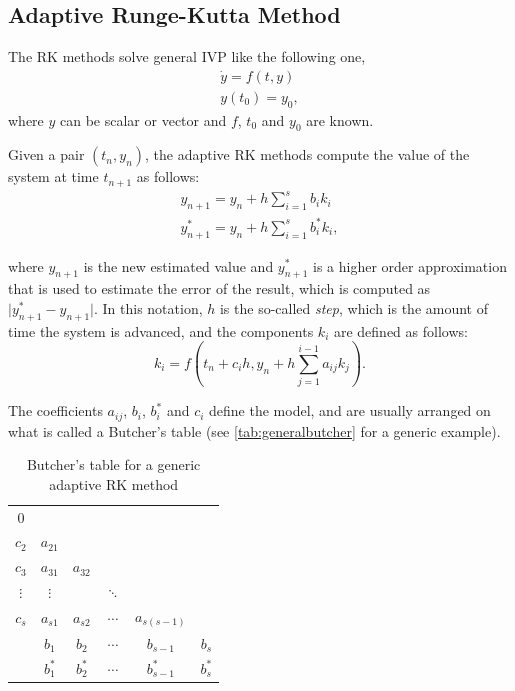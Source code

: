 \subsection{Adaptive Runge-Kutta Method}

The \ac{RK} methods solve general \ac{IVP} like the following one,
\begin{align*}
	\dot{y} = f(t,y) \\
	y(t_0) = y_0,
\end{align*}
where $y$ can be scalar or vector and $f$, $t_0$ and $y_0$ are known.

Given a pair $(t_n, y_n)$, the adaptive \ac{RK} methods compute the value of the system at time $t_{n+1}$ as follows:
\begin{align*}
	y_{n+1} = y_n + h \sum_{i=1}^s b_i k_i\\
	y^*_{n+1} = y_n + h \sum_{i=1}^s b^*_i k_i,
\end{align*}

where $y_{n+1}$ is the new estimated value and $y^*_{n+1}$ is a higher order approximation that is used to estimate the error of the result, which is computed as $\vert y^*_{n+1} - y_{n+1} \vert$. In this notation, $h$ is the so-called \emph{step}, which is the amount of time the system is advanced, and the components $k_i$ are defined as follows:
\[
	k_i = f(t_n + c_ih, y_n + h\sum_{j=1}^{i-1} a_{ij} k_j).
\]

The coefficients $a_{ij}$, $b_i$, $b_i^*$ and $c_i$ define the model, and are usually arranged on what is called a Butcher's table (see \autoref{tab:generalbutcher} for a generic example).

\begin{table}[bth]
	\myfloatalign
	\begin{tabularx}{.54\textwidth}{c|ccccc}
		$0$&  & & & & \\
		$c_2$& $a_{21}$ & & & & \\
		$c_3$& $a_{31}$ & $a_{32}$ & & & \\
		$\vdots$& $\vdots$ &  & $\ddots$ & & \\
		$c_s$& $a_{s1}$  & $a_{s2}$ & $\cdots$ & $a_{s(s-1)}$ & \\ \hline
		& $b_1$ & $b_2$ & $\cdots$ & $b_{s-1}$ & $b_s$ \\ \hline
		& $b^*_1$ & $b^*_2$ & $\cdots$ & $b^*_{s-1}$ & $b^*_s$ \\
	\end{tabularx}
	\caption{Butcher's table for a generic adaptive \ac{RK} method}
	\label{tab:generalbutcher}
\end{table}


